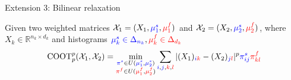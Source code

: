 \documentclass{beamer}
\newcommand{\coot}{\text{COOT}}
\newcommand{\cX}{\mathcal X}
\newcommand{\bbR}{\mathbb R}
\newcommand{\pis}{{\color{blue}{\pi^s}}}
\newcommand{\pif}{{\color{red}{\pi^f}}}
\newcommand{\mfsrc}{{\color{red}{\mu_1^f}}}
\newcommand{\mftg}{{\color{red}{\mu_2^f}}}
\newcommand{\mssrc}{{\color{blue}{\mu_1^s}}}
\newcommand{\mstg}{{\color{blue}{\mu_2^s}}}
\begin{document}
\begin{frame}{Extension 3: Bilinear relaxation}
\scriptsize

\begin{definition}
Given two weighted matrices $\cX_1 = (X_1, \mssrc, \mfsrc)$
and $\cX_2 = (X_2, \mstg, \mftg)$, where
$X_k \in \bbR^{n_k \times d_k}$ and histograms
${\color{blue}{\mu^s_k \in \Delta_{n_k}}}, {\color{red}{\mu^f_k \in \Delta_{d_k}}}$
\begin{align*}
  \coot_p^p(\cX_1, \cX_2) =
  \min_{\substack{\pis \in U(\mssrc,\mstg) \\ \pif \in U(\mfsrc,\mftg)}}
  \sum_{{\color{blue}{i}},{\color{blue}{j}},{\color{red}{k}},{\color{red}{l}}}
  |(X_1)_{{\color{blue}{i}} {\color{red}{k}}} - (X_2)_{{\color{blue}{j}}{\color{red}{l}}}|^p {\color{blue}{\pi^s_{ij}}} {\color{red}{\pi^f_{kl}}}
\end{align*}
\end{definition}



\end{frame}
\end{document}
